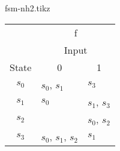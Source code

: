 \documentclass[../main-sheet.tex]{subfiles}
\begin{document}
\begin{table}[H]
    \begin{minipage}[c]{0.58\linewidth}
        \centering
        {fsm-nh2.tikz}
    \end{minipage}
    \begin{minipage}[c]{0.38\linewidth}
        \centering
        \begin{tabular}{@{}cll@{}}
            \toprule
                    & \multicolumn{2}{c}{f}               \\ \cmidrule(l){2-3}
                    & \multicolumn{2}{c}{Input}           \\
            State   & \multicolumn{1}{c}{0} & \multicolumn{1}{c}{1}       \\ \midrule
            $s_0$   & $ s_0 $, $ s_1 $          & $ s_3 $ \\
            $ s_1 $ & $ s_0 $                   & $ s_1 $, $ s_3 $ \\
            $ s_2 $ &                           & $ s_0 $, $ s_2 $ \\
            $ s_3 $ & $ s_0 $, $ s_1 $, $ s_2 $                   & $ s_1 $ \\ \bottomrule
        \end{tabular}
    \end{minipage}
\end{table}
\end{document}
